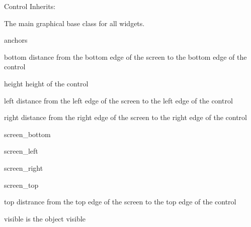 \begin{classdesc*}{Control}
Inherits:

The main graphical base class for all widgets.

\begin{memberdesc}{anchors}

\end{memberdesc}

\begin{memberdesc}{bottom}
distance from the bottom edge of 
the screen to the bottom edge of the control
\end{memberdesc}

\begin{memberdesc}{height}
height of the control
\end{memberdesc}

\begin{memberdesc}{left}
distance from the left edge of 
the screen to the left edge of the control
\end{memberdesc}

\begin{memberdesc}{right}
distance from the right edge of 
the screen to the right edge of the control
\end{memberdesc}

\begin{memberdesc}{screen_bottom}

\end{memberdesc}

\begin{memberdesc}{screen_left}

\end{memberdesc}

\begin{memberdesc}{screen_right}

\end{memberdesc}

\begin{memberdesc}{screen_top}

\end{memberdesc}

\begin{memberdesc}{top}
distrance from the top edge of 
the screen to the top edge of the control
\end{memberdesc}

\begin{memberdesc}{visible}
is the object visible
\end{memberdesc}


\end{classdesc*}
